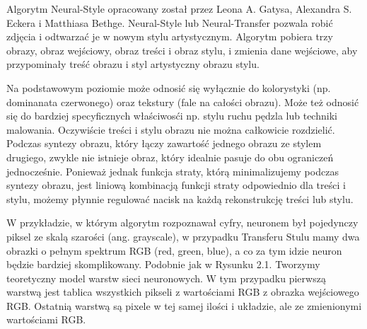 \documentclass[brudnopis]{xmgr}
\begin{document}
Algorytm Neural-Style opracowany został przez Leona A. Gatysa, Alexandra S. Eckera i Matthiasa Bethge. Neural-Style lub Neural-Transfer pozwala robić zdjęcia i odtwarzać je w nowym stylu artystycznym. Algorytm pobiera trzy obrazy, obraz wejściowy, obraz treści i obraz stylu, i zmienia dane wejściowe, aby przypominały treść obrazu i styl artystyczny obrazu stylu.

Na podstawowym poziomie może odnosić się wyłącznie do kolorystyki (np. dominanata czerwonego) oraz tekstury (fale na całości obrazu).
Może też odnosić się do bardziej specyficznych właściwosći np. stylu ruchu pędzla lub techniki malowania. Oczywiście treści i stylu obrazu nie można całkowicie rozdzielić. Podczas syntezy obrazu, który łączy zawartość jednego obrazu ze stylem drugiego, zwykle nie istnieje obraz, który idealnie pasuje do obu ograniczeń jednocześnie. Ponieważ jednak funkcja straty, którą minimalizujemy podczas syntezy obrazu, jest liniową kombinacją funkcji straty odpowiednio dla treści i stylu, możemy płynnie regulować nacisk na każdą rekonstrukcję treści lub stylu.

W przykładzie, w którym algorytm rozpoznawał cyfry, neuronem był pojedynczy piksel ze skalą szarości (ang. grayscale), w przypadku Transferu Stulu mamy dwa obrazki o pełnym  spektrum RGB (red, green, blue), a co za tym idzie neuron będzie bardziej skomplikowany. Podobnie jak w Rysunku 2.1. Tworzymy teoretyczny model warstw sieci neuronowych. W tym przypadku pierwszą  warstwą jest tablica wszystkich pikseli z wartościami RGB z obrazka wejściowego RGB. Ostatnią warstwą  są pixele w tej samej ilości i układzie, ale ze zmienionymi wartościami RGB. 
\end{document}
